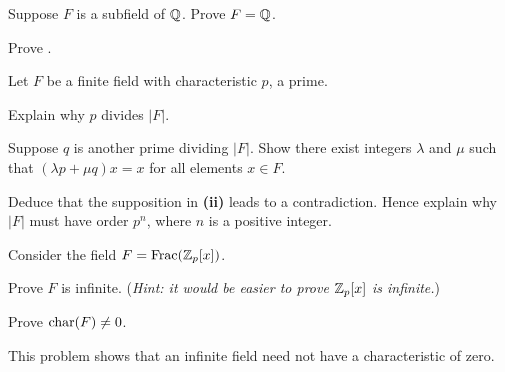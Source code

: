 \begin{problem}\label{problem-Q-is-prime-field}
    Suppose $F$ is a subfield of $\mathbb{Q}$. Prove $F = \mathbb{Q}$.
\end{problem}

\begin{problem}\label{problem-homomorphism-from-field-is-injective-or-trivial}
    Prove .
\end{problem}

\begin{problem}\label{problem-finite-field-has-prime-power-order}
    Let $F$ be a finite field with characteristic $p$, a prime.
    \begin{partquestions}{\roman*}
        \item Explain why $p$ divides $|F|$.
        \item Suppose $q$ is another prime dividing $|F|$. Show there exist integers $\lambda$ and $\mu$ such that $(\lambda p + \mu q)x = x$ for all elements $x \in F$.
        \item Deduce that the supposition in \textbf{(ii)} leads to a contradiction. Hence explain why $|F|$ must have order $p^n$, where $n$ is a positive integer.
    \end{partquestions}
\end{problem}

\begin{problem}
    Consider the field $F = \mathrm{Frac}(\mathbb{Z}_p[x])$.
    \begin{partquestions}{\alph*}
        \item Prove $F$ is infinite.\newline
        (\textit{Hint: it would be easier to prove $\mathbb{Z}_p[x]$ is infinite.})
        \item Prove $\mathrm{char}(F) \neq 0$.
    \end{partquestions}
\end{problem}
\begin{remark}
    This problem shows that an infinite field need not have a characteristic of zero.
\end{remark}
